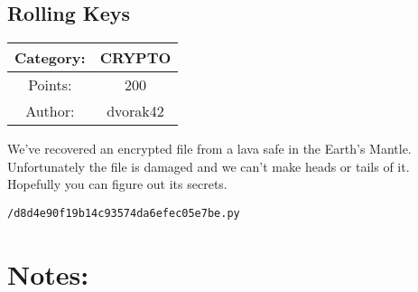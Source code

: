 \begin{center}
\section*{Rolling Keys}
{\large
\begin{tabular}{| c c |}
\hline
Category: & CRYPTO\\\hline
Points: & 200\\\hline
Author: & dvorak42\\\hline
\end{tabular}
}
\end{center}
\vspace{0.5in}

{\large
We've recovered an encrypted file from a lava safe in the Earth's Mantle. Unfortunately the file is damaged and we can't make heads or tails of it. Hopefully you can figure out its secrets.
}
\vspace{0.25in}
\begin{center}
  {\Large\tt /d8d4e90f19b14c93574da6efec05e7be.py}
\end{center}

\vspace{0.25in}
\section*{Notes:}
